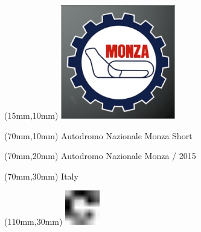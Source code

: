 \null\newpage
\begin{textblock*}{50mm}(15mm,10mm)%
\includegraphics[width=50mm]{LG/2015-05-20_00086.png}
\end{textblock*}
\begin{textblock*}{130mm}(70mm,10mm)%
{\fontsize{20}{20}\selectfont Autodromo Nazionale Monza Short}\\
\end{textblock*}
\begin{textblock*}{120mm}(70mm,20mm)%
{\fontsize{16}{16}\selectfont Autodromo Nazionale Monza / 2015}\\
\end{textblock*}
\begin{textblock*}{120mm}(70mm,30mm)%
{\fontsize{12}{12}\selectfont Italy}
\end{textblock*}
\begin{textblock*}{30mm}(110mm,30mm)%
\centering
\includegraphics[height=15mm]{icons/fa-rotate-right.pdf}
\end{textblock*}
